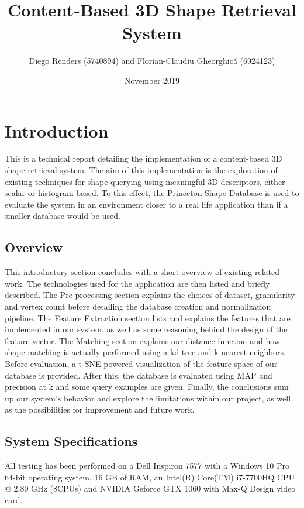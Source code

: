 \documentclass{bigdata}
\title{Content-Based 3D Shape Retrieval System}
\author{Diego Renders (5740894) and Florian-Claudiu Gheorghică (6924123)}
\date{November 2019}
\begin{document}
\setlength{\cftbeforesecskip}{1pt}
\begin{titlingpage}
	\maketitle
\end{titlingpage}

\newpage
\setcounter{page}{1}
\tableofcontents

\section{Introduction}

This is a technical report detailing the implementation of a content-based 3D shape retrieval system. The aim of this implementation is the exploration of existing techniques for shape querying using meaningful 3D descriptors, either scalar or histogram-based. To this effect, the Princeton Shape Database is used to evaluate the system in an environment closer to a real life application than if a smaller database would be used.

\subsection{Overview}
This introductory section concludes with a short overview of existing related work. The technologies used for the application are then listed and briefly described. The Pre-processing section explains the choices of dataset, granularity and vertex count before detailing the database creation and normalization pipeline. The Feature Extraction section lists and explains the features that are implemented in our system, as well as some reasoning behind the design of the feature vector. The Matching section explains our distance function and how shape matching is actually performed using a kd-tree and k-nearest neighbors. Before evaluation, a t-SNE-powered visualization of the feature space of our database is provided. After this, the database is evaluated using MAP and precision at k and some query examples are given. Finally, the conclusions sum up our system's behavior and explore the limitations within our project, as well as the possibilities for improvement and future work.

\subsection{System Specifications}
All testing has been performed on a Dell Inspiron 7577 with a Windows 10 Pro 64-bit operating system, 16 GB of RAM, an Intel(R) Core(TM) i7-7700HQ CPU @ 2.80 GHz (8CPUs) and NVIDIA Geforce GTX 1060 with Max-Q Design video card.
\end{document}
